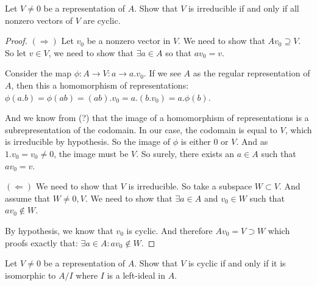 \begin{thm}
Let \(V\neq 0\) be a representation of \(A\). Show that \(V\) is irreducible if and only if all nonzero vectors of \(V\) are cyclic.
\end{thm}

\begin{proof} \((\Longrightarrow)\) Let \(v_{0}\) be a nonzero vector in \(V\). We need to show that \(Av_{0}\supseteq V\). So let \(v\in V\), we need to show that \(\exists a\in A\) so that \(av_{0}=v\).

Consider the map \(\phi  : A \rightarrow V : a \rightarrow a.v_{0}\). If we see \(A\) as the regular representation of \(A\), then this a homomorphism of representations:
\(\phi (a.b)=\phi (ab)=(ab).v_{0}= a.(b.v_{0})=a.\phi (b)\).

And we know from (?) that the image of a homomorphism of representations is a subrepresentation of the codomain. In our case, the codomain is equal to \(V\), which is irreducible by hypothesis. So the image of \(\phi \) is either \(0\) or \(V\). And as \(1.v_{0}=v_{0}\neq 0\), the image must be \(V\). So surely, there exists an \(a\in A\) such that \(av_{0}=v\).

\((\Longleftarrow )\) We need to show that \(V\) is irreducible. So take a subspace \(W\subset V\). And assume that \(W\neq 0,V\). We need to show that \(\exists a\in A\) and \(v_{0}\in W\) such that \(av_{0}\not\in W\).

By hypothesis, we know that \(v_{0}\) is cyclic. And therefore \(Av_{0}=V\supset W\) which proofs exactly that: \(\exists a\in A : av_{0}\not\in W.\)
\end{proof}

\begin{thm}
Let \(V\neq 0\) be a representation of \(A\). Show that \(V\) is cyclic if and only if it is isomorphic to \(A/I\) where \(I\) is a left-ideal in \(A\).
\end{thm}

